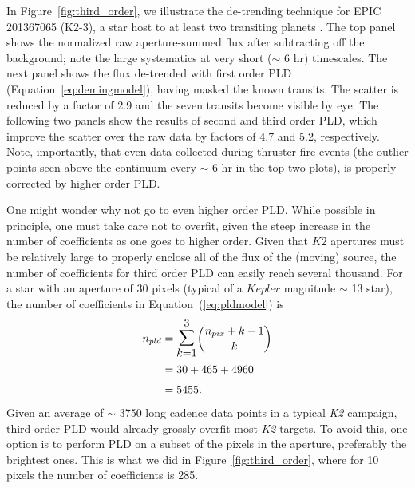 \documentclass[]{emulateapj}
\begin{document}
In Figure~\ref{fig:third_order}, we illustrate the de-trending technique for EPIC
201367065 (K2-3), a star host to at least two transiting planets \citep{CRO15}. The top
panel shows the normalized raw aperture-summed flux after subtracting off the 
background; note the large systematics at very short ($\sim$ 6 hr) timescales. The
next panel shows the flux de-trended with first order PLD (Equation~\ref{eq:demingmodel}),
having masked the known transits. The scatter is reduced by a factor of 2.9 and the
seven transits become visible by eye. The following two panels show the results of
second and third order PLD, which improve the scatter over the raw data by factors of 
4.7 and 5.2, respectively. Note, importantly, that even data collected during thruster
fire events (the outlier points seen above the continuum every $\sim$ 6 hr in the top 
two plots), is properly corrected by higher order PLD.

One might wonder why not go to even higher order PLD. While possible in principle,
one must take care not to overfit, given the steep increase in the number of
coefficients as one goes to higher order. Given that $K2$ apertures must be relatively
large to properly enclose all of the flux of the (moving) source, the number of
coefficients for third order PLD can easily reach several thousand. For a star with an
aperture of 30 pixels (typical of a $Kepler$ magnitude $\sim$ 13 star), the number of
coefficients in Equation~(\ref{eq:pldmodel}) is
\begin{align}
n_{pld} &= \mathlarger{\mathlarger{\sum\limits_{k=1}^{3}}}{n_{pix} + k - 1 \choose k} \nonumber\\
        &= 30 + 465 + 4960 \nonumber\\
        &= 5455.
\end{align}
Given an average of $\sim$ 3750 long cadence data points in a typical \emph{K2} 
campaign, third order PLD would already grossly overfit most \emph{K2} targets. To
avoid this, one option is to perform PLD on a subset of the pixels in the aperture,
preferably the brightest ones. This is what we did in Figure~\ref{fig:third_order}, 
where for 10 pixels the number of coefficients is 285.
\end{document}
